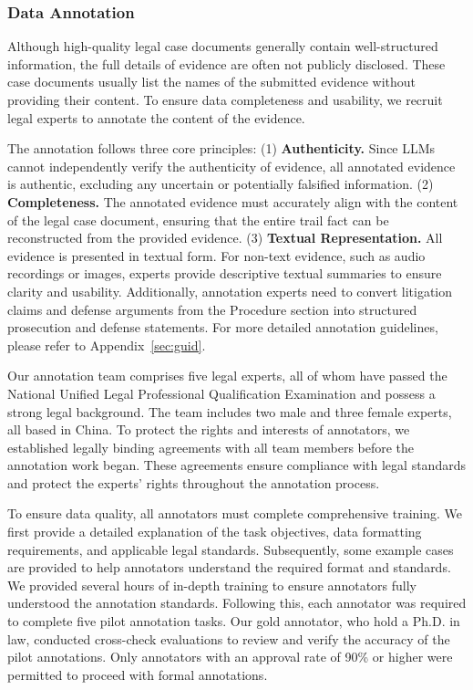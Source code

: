 \subsubsection{Data Annotation}
Although high-quality legal case documents generally contain well-structured information, the full details of evidence are often not publicly disclosed. These case documents usually list the names of the submitted evidence without providing their content. 
To ensure data completeness and usability, we recruit legal experts to annotate the content of the evidence.


The annotation follows three core principles: (1) \textbf{Authenticity.} Since LLMs cannot independently verify the authenticity of evidence, all annotated evidence is authentic, excluding any uncertain or potentially falsified information.
(2) \textbf{Completeness.}  The annotated evidence must accurately align with the content of the legal case document, ensuring that the entire trail fact can be reconstructed from the provided evidence.
(3) \textbf{Textual Representation.} All evidence is presented in textual form. For non-text evidence, such as audio recordings or images, experts provide descriptive textual summaries to ensure clarity and usability.
Additionally, annotation experts need to convert litigation claims and defense arguments from the Procedure section into structured prosecution and defense statements. For more detailed annotation guidelines, please refer to Appendix~\ref{sec:guid}.


Our annotation team comprises five legal experts, all of whom have passed the National Unified Legal Professional Qualification Examination and possess a strong legal background. The team includes two male and three female experts, all based in China. To protect the rights and interests of annotators, we established legally binding agreements with all team members before the annotation work began.
These agreements ensure compliance with legal standards and protect the experts' rights throughout the annotation process.


To ensure data quality, all annotators must complete comprehensive training. We first provide a detailed explanation of the task objectives, data formatting requirements, and applicable legal standards. Subsequently, some example cases are provided to help annotators understand the required format and standards.
We provided several hours of in-depth training to ensure annotators fully understood the annotation standards. Following this, each annotator was required to complete five pilot annotation tasks.  Our gold annotator, who hold a Ph.D. in law, conducted cross-check evaluations to review and verify the accuracy of the pilot annotations. Only annotators with an approval rate of 90\% or higher were permitted to proceed with formal annotations.



